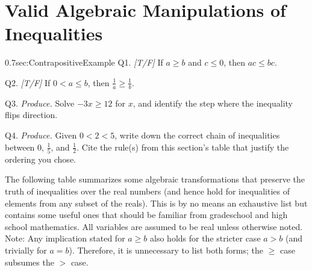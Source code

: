 \section{Valid Algebraic Manipulations of Inequalities}
\label{sec:ManipulatingInequalities}

\begin{selfcheckbox}{0.7}{sec:ContrapositiveExample}
  \hypertarget{q:ch0:ineq}{}
  Q1. \textit{[T/F]} If $a \geq b$ and $c \leq 0$, then $ac \leq bc$.\par\smallskip
  Q2. \textit{[T/F]} If $0 < a \leq b$, then $\tfrac{1}{a} \geq \tfrac{1}{b}$.\par\smallskip
  Q3. \textit{Produce.} Solve $-3x \geq 12$ for $x$, and identify the step where the inequality flips direction.\par\smallskip
  Q4. \textit{Produce.} Given $0 < 2 < 5$, write down the correct chain of inequalities between $0$, $\tfrac{1}{5}$, and $\tfrac{1}{2}$. Cite the rule(s) from this section's table that justify the ordering you chose.
  \par\medskip\hfill{}
\end{selfcheckbox}

The following table summarizes some algebraic transformations that preserve the truth of inequalities over the real numbers (and hence hold for inequalities of elements from any subset of the reals). This is by no means an exhaustive list but contains some useful ones that should be familiar from gradeschool and high school mathematics. All variables are assumed to be real unless otherwise noted. \steezybreak \\

\noindent Note: Any implication stated for $a \ge b$ also holds for the stricter case 
$a > b$ (and trivially for $a = b$). Therefore, it is unnecessary to list both forms; 
the $\ge$ case subsumes the $>$ case.

